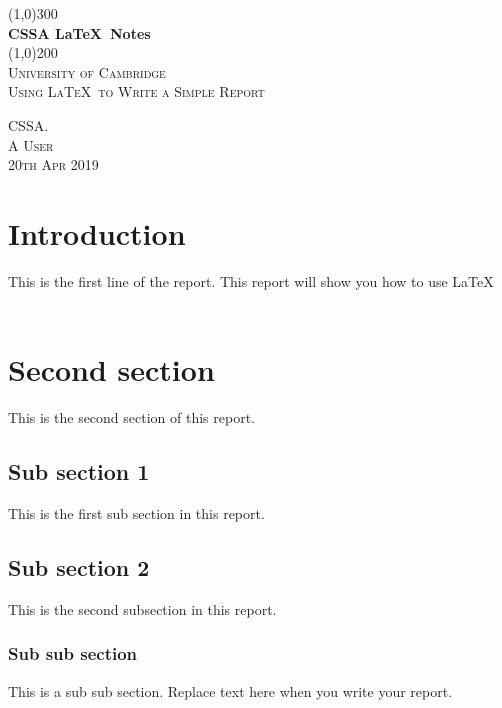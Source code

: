 \documentclass{article}
\begin{document}
\begin{titlepage}
	\begin{center}
		\line(1,0){300}\\
		[0.25in]
		\huge{\textbf{ CSSA \LaTeX\ Notes}}\\
		[2mm]
		\line(1,0){200}\\
		[1.5cm]
		\textsc{\LARGE University of Cambridge}\\
		\textsc{\LARGE Using \LaTeX\ to Write a Simple Report}\\
		[8cm]
	\end{center}
	\begin{flushright}
		\textsc{\large CSSA. \\ A \LateX{} User\\
		20th Apr 2019}
	\end{flushright}
\end{titlepage}
\cleardoublepage
\tableofcontents
\listoffigures
\listoftables

\thispagestyle{empty}
\cleardoublepage

\setcounter{page}{1}

\cleardoublepage
\section{Introduction} 
This is the first line of the report. This report will show you how to use \LaTeX\\\
\lipsum[1]
\section{Second section}
This is the second section of this report.
\subsection{Sub section 1} 
This is the first sub section in this report.
\subsection{Sub section 2} 
This is the second subsection in this report.
\subsubsection{Sub sub section}
This is a sub sub section. Replace text here when you write your report.
\cleardoublepage
\end{document}
